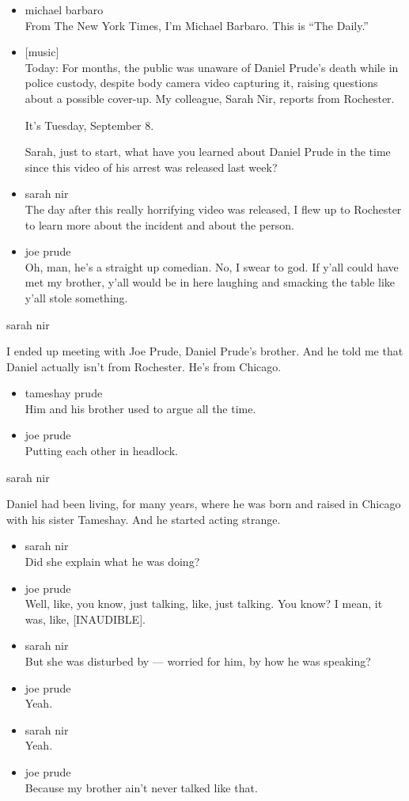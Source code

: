 \begin{itemize}
\item
  michael barbaro\\
  From The New York Times, I'm Michael Barbaro. This is ``The Daily.''
\item
  {[}music{]}\\
  Today: For months, the public was unaware of Daniel Prude's death
  while in police custody, despite body camera video capturing it,
  raising questions about a possible cover-up. My colleague, Sarah Nir,
  reports from Rochester.

  It's Tuesday, September 8.

  Sarah, just to start, what have you learned about Daniel Prude in the
  time since this video of his arrest was released last week?
\item
  sarah nir\\
  The day after this really horrifying video was released, I flew up to
  Rochester to learn more about the incident and about the person.
\item
  joe prude\\
  Oh, man, he's a straight up comedian. No, I swear to god. If y'all
  could have met my brother, y'all would be in here laughing and
  smacking the table like y'all stole something.
\end{itemize}

sarah nir

I ended up meeting with Joe Prude, Daniel Prude's brother. And he told
me that Daniel actually isn't from Rochester. He's from Chicago.

\begin{itemize}
\item
  tameshay prude\\
  Him and his brother used to argue all the time.
\item
  joe prude\\
  Putting each other in headlock.
\end{itemize}

sarah nir

Daniel had been living, for many years, where he was born and raised in
Chicago with his sister Tameshay. And he started acting strange.

\begin{itemize}
\item
  sarah nir\\
  Did she explain what he was doing?
\item
  joe prude\\
  Well, like, you know, just talking, like, just talking. You know? I
  mean, it was, like, {[}INAUDIBLE{]}.
\item
  sarah nir\\
  But she was disturbed by --- worried for him, by how he was speaking?
\item
  joe prude\\
  Yeah.
\item
  sarah nir\\
  Yeah.
\item
  joe prude\\
  Because my brother ain't never talked like that.
\end{itemize}

